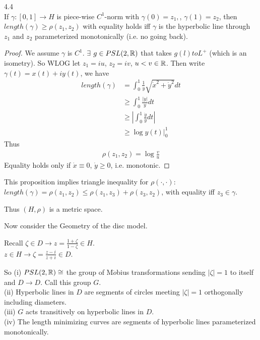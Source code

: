\documentclass[a4paper]{article}
\begin{document}
\begin{prop} 4.4\\
If $\gamma:[0,1] \to H$ is piece-wise $C^1$-norm with $\gamma(0) =z_1,$, $\gamma(1) = z_2$, then $length(\gamma) \geq \rho(z_1,z_2)$ with equality holds iff $\gamma$ is the hyperbolic line through $z_1$ and $z_2$ parameterized monotonically (i.e. no going back).
\begin{proof}
We assume $\gamma$ is $C^1$. $\exists$ $g \in PSL(2,\mathbb{R})$ that takes $g(l) to L^+$ (which is an isometry). So WLOG let $z_1 = iu$, $z_2 = iv$, $u<v \in \mathbb{R}$. Then write $\gamma(t) = x(t) + iy(t)$, we have
\begin{equation*}
\begin{aligned}
length(\gamma) &= \int_0^1 \frac{1}{y} \sqrt{\dot{x}^2 + \dot{y}^2} dt\\
&\geq \int_0^1  \frac{|\dot{y}|}{y}dt\\
&\geq \left|\int_0^1 \frac{\dot{y}}{y} dt\right|\\
&\geq \log y(t) |_0^1
\end{aligned}
\end{equation*}
Thus
\begin{equation*}
\begin{aligned}
\rho(z_1,z_2) = \log \frac{v}{u}
\end{aligned}
\end{equation*}
Equality holds only if $\dot{x} \equiv 0$, $\dot{y} \geq 0$, i.e. monotonic.
\end{proof}
\end{prop}

\begin{rem}
This proposition implies triangle inequality for $\rho(\cdot,\cdot)$: $length(\gamma) = \rho(z_1,z_2) \leq \rho(z_1,z_3) + \rho(z_3,z_2)$, with equality iff $z_3 \in \gamma$.

Thus $(H,\rho)$ is a metric space.
\end{rem}

Now consider the Geometry of the disc model.

Recall $\zeta \in D \to z = \frac{1+\zeta}{1-\zeta} \in H$.\\
$z \in H \to \zeta = \frac{z-i}{z+i}\in D$.

So (i) $PSL(2,\mathbb{R}) \cong$ the group of M$\ddot{o}$bius transformations sending $|\zeta| = 1$ to itself and $D \to D$. Call this group $G$.\\
(ii) Hyperbolic lines in $D$ are segments of circles meeting  $|\zeta| = 1$ orthogonally including diameters.\\
(iii) $G$ acts transitively on hyperbolic lines in $D$.\\
(iv) The length minimizing curves are segments of hyperbolic lines parameterized monotonically.
\end{document}
